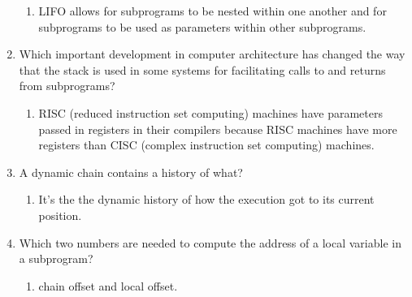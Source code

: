 \begin{enumerate}
  
    \begin{answer}

    \begin{enumerate}
    \item LIFO allows for subprograms to be nested within one another
 and for subprograms to be used as parameters within other subprograms.  
    \end{enumerate}

    \end{answer}

  \item Which important development in computer architecture
    has changed the way that the stack is used in some
    systems for facilitating calls to and returns from
    subprograms?

    \begin{answer}

    \begin{enumerate}
    \item RISC (reduced instruction set computing) machines have parameters passed 
in registers in their compilers because RISC machines have more registers than CISC
 (complex instruction set computing) machines.
 
    \end{enumerate}

    \end{answer}
  
  \item A dynamic chain contains a history of what?

  
    \begin{answer}

    \begin{enumerate}
    \item It's the the dynamic history of how the execution got to its current position.
 
    \end{enumerate}

    \end{answer}

  \item Which two numbers are needed to compute
    the address of a local variable in a subprogram?

  
    \begin{answer}

    \begin{enumerate}
    \item chain offset and local offset.
    \end{enumerate}


\end{answer}
\end{enumerate}
